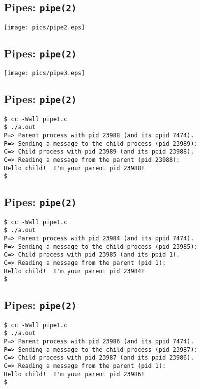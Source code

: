 \documentclass[xga]{xdvislides}
\begin{document}
\subsection{Pipes: {\tt pipe(2)}}
\begin{center}
	\texttt{[image: pics/pipe2.eps]}
\end{center}

\subsection{Pipes: {\tt pipe(2)}}
\begin{center}
	\texttt{[image: pics/pipe3.eps]}
\end{center}

\subsection{Pipes: {\tt pipe(2)}}
\begin{verbatim}
$ cc -Wall pipe1.c
$ ./a.out
P=> Parent process with pid 23988 (and its ppid 7474).
P=> Sending a message to the child process (pid 23989):
C=> Child process with pid 23989 (and its ppid 23988).
C=> Reading a message from the parent (pid 23988):
Hello child!  I'm your parent pid 23988!
$
\end{verbatim}
\vfill


\subsection{Pipes: {\tt pipe(2)}}
\begin{verbatim}
$ cc -Wall pipe1.c
$ ./a.out
P=> Parent process with pid 23984 (and its ppid 7474).
P=> Sending a message to the child process (pid 23985):
C=> Child process with pid 23985 (and its ppid 1).
C=> Reading a message from the parent (pid 1):
Hello child!  I'm your parent pid 23984!
$
\end{verbatim}
\vfill

\subsection{Pipes: {\tt pipe(2)}}
\begin{verbatim}
$ cc -Wall pipe1.c
$ ./a.out
P=> Parent process with pid 23986 (and its ppid 7474).
P=> Sending a message to the child process (pid 23987):
C=> Child process with pid 23987 (and its ppid 23986).
C=> Reading a message from the parent (pid 1):
Hello child!  I'm your parent pid 23986!
$
\end{verbatim}
\vfill
\end{document}
